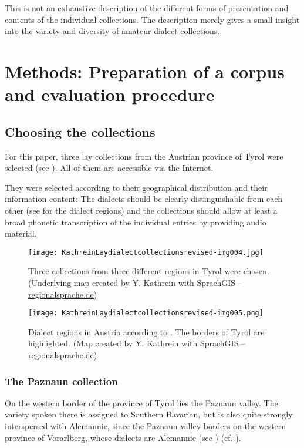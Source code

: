 \documentclass[output=paper]{langscibook}
\begin{document}
This is not an exhaustive description of the different forms of presentation and contents of the individual collections. The description merely gives a small insight into the variety and diversity of amateur dialect collections.

\section{Methods: Preparation of a corpus and evaluation procedure}
\label{sec:kathrein:3}
\subsection{Choosing the collections}
\label{sec:kathrein:3.1}
For this paper, three lay collections from the Austrian province of Tyrol were selected (see ). All of them are accessible via the Internet.

They were selected according to their geographical distribution and their information content: The dialects should be clearly distinguishable from each other (see  for the dialect regions) and the collections should allow at least a broad phonetic transcription of the individual entries by providing audio material. 


\begin{figure}
\texttt{[image: KathreinLaydialectcollectionsrevised-img004.jpg]}
\caption{\label{fig:kathrein:4} Three collections from three different regions in Tyrol were chosen.
(Underlying map created by Y. Kathrein with SprachGIS – \url{regionalsprache.de})}
\end{figure}

\begin{figure}
\texttt{[image: KathreinLaydialectcollectionsrevised-img005.png]}
\caption{\label{fig:kathrein:5} Dialect regions in Austria according to \cite{Wiesinger1983}. The borders of Tyrol are highlighted. (Map created by Y. Kathrein with SprachGIS – \url{regionalsprache.de})}
\end{figure}

\subsubsection{The Paznaun collection}
\label{sec:kathrein:3.1.1}
On the western border of the province of Tyrol lies the Paznaun valley. The variety spoken there is assigned to Southern Bavarian, but is also quite strongly interspersed with Alemannic, since the Paznaun valley borders on the western province of Vorarlberg, whose dialects are Alemannic (see ) (cf. \citealt[836--842]{Wiesinger1983}).
\end{document}
